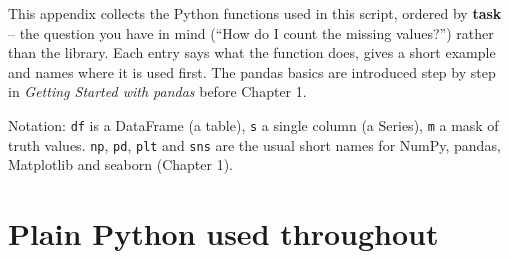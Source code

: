 \documentclass[
  letterpaper,
  DIV=11,
  numbers=noendperiod]{scrreprt}
\begin{document}
This appendix collects the Python functions used in this script, ordered
by \textbf{task} -- the question you have in mind (``How do I count the
missing values?'') rather than the library. Each entry says what the
function does, gives a short example and names where it is used first.
The pandas basics are introduced step by step in \emph{Getting Started
with pandas} before Chapter 1.

Notation: \texttt{df} is a DataFrame (a table), \texttt{s} a single
column (a Series), \texttt{m} a mask of truth values. \texttt{np},
\texttt{pd}, \texttt{plt} and \texttt{sns} are the usual short names for
NumPy, pandas, Matplotlib and seaborn (Chapter 1).

\section{Plain Python used
throughout}\label{plain-python-used-throughout}
\end{document}
